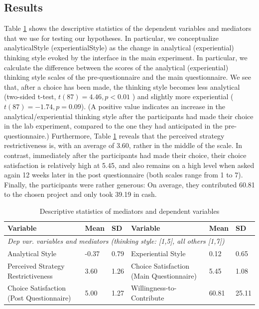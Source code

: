 \subsection{Results}
Table \ref{tab:descriptive} shows
the descriptive statistics of the dependent variables and mediators that we use
for testing our hypotheses. In particular, we conceptualize analyticalStyle
(experientialStyle) as the change in analytical (experiential) thinking style
evoked by the interface in the main experiment. In particular, we calculate the
difference between the scores of the analytical (experiential) thinking style
scales of the pre-questionnaire and the main questionnaire. We see that, after
a choice has been made, the thinking style becomes less analytical (two-sided
t-test, $ t(87)=4.46, p<0.01 $ ) and slightly more experiential ($t(87)=-1.74,
p=0.09$). (A positive value indicates an increase in the analytical/experiential
thinking style after the participants had made their choice in the lab
experiment, compared to the one they had anticipated in the pre-questionnaire.)
Furthermore, Table \ref{tab:descriptive}
reveals that the perceived strategy restrictiveness is, with an average of
3.60, rather in the middle of the scale. In contrast, immediately after the
participants had made their choice, their choice satisfaction is relatively
high at 5.45, and also remains on a high level when asked again 12 weeks later
in the post questionnaire (both scales range from 1 to 7). Finally, the
participants were rather generous: On average, they contributed 60.81 to the
chosen project and only took 39.19 in cash.\\
\begin{table}[h]
    \centering
    \renewcommand{\arraystretch}{1.2} %

    \begin{tabular}{p{5cm} p{0.8cm} p{0.8cm} p{5cm} p{0.8cm} p{0.8cm}}
        \toprule
        \textbf{Variable} & \textbf{Mean} & \textbf{SD} & \textbf{Variable} & \textbf{Mean} & \textbf{SD} \\
        \midrule
        \multicolumn{6}{l}{\small{\textit{Dep var. variables and mediators (thinking style: [1,5], all others [1,7])}}} \\
        Analytical Style & -0.37 & 0.79 & Experiential Style & 0.12 & 0.65 \\
        Perceived Strategy Restrictiveness & 3.60 & 1.26 & Choice Satisfaction (Main Questionnaire) & 5.45 & 1.08 \\
        Choice Satisfaction (Post Questionnaire) & 5.00 & 1.27 & Willingness-to-Contribute & 60.81 & 25.11 \\
        \bottomrule
    \end{tabular}
        \caption{Descriptive statistics of mediators and dependent variables }
    \label{tab:descriptive}
\end{table}
